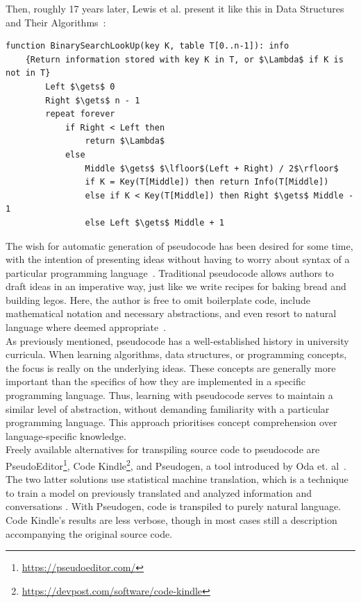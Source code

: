Then, roughly 17 years later, Lewis et al. present it like this in Data Structures and Their Algorithms~\cite[182]{BOOK:DSA/Lewis}: \hfill \\

\begin{lstlisting}[basicstyle=\footnotesize\ttfamily, frame=tlrb]
    function BinarySearchLookUp(key K, table T[0..n-1]): info
    {Return information stored with key K in T, or $\Lambda$ if K is not in T}
        Left $\gets$ 0
        Right $\gets$ n - 1
        repeat forever
            if Right < Left then
                return $\Lambda$
            else
                Middle $\gets$ $\lfloor$(Left + Right) / 2$\rfloor$
                if K = Key(T[Middle]) then return Info(T[Middle])
                else if K < Key(T[Middle]) then Right $\gets$ Middle - 1
                else Left $\gets$ Middle + 1
\end{lstlisting}

The wish for automatic generation of pseudocode has been desired for some time, with the intention of presenting ideas without having to worry about syntax of a particular programming language~\cite{desireToGetPseudocodeGeneration}. Traditional pseudocode allows authors to draft ideas in an imperative way, just like we write recipes for baking bread and building legos. Here, the author is free to omit boilerplate code, include mathematical notation and necessary abstractions, and even resort to natural language where deemed appropriate~\cite{BOOK:intro/Cormen/Leiserson, DBLP:conf/els/Nuallain15}. \hfill \\

As previously mentioned, pseudocode has a well-established history in university curricula. When learning algorithms, data structures, or programming concepts, the focus is really on the underlying ideas. These concepts are generally more important than the specifics of how they are implemented in a specific programming language. Thus, learning with pseudocode serves to maintain a similar level of abstraction, without demanding familiarity with a particular programming language. This approach prioritises concept comprehension over language-specific knowledge. \hfill \\

Freely available alternatives for transpiling source code to pseudocode are PseudoEditor\footnote{\url{https://pseudoeditor.com/}}, Code Kindle\footnote{\url{https://devpost.com/software/code-kindle}}, and Pseudogen, a tool introduced by Oda et. al~\cite{DBLP:conf/kbse/OdaFNHSTN15}. The two latter solutions use statistical machine translation, which is a technique to train a model on previously translated and analyzed information and conversations%
. With Pseudogen, code is transpiled to purely natural language. Code Kindle's results are less verbose, though in most cases still a description accompanying the original source code. \hfill \\

